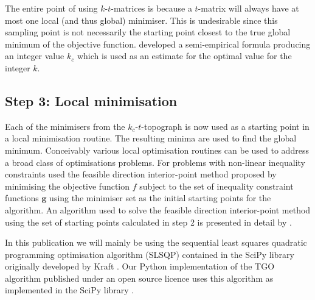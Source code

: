 %
The entire point of using $k$-$t$-matrices is because a $t$-matrix will always have at most one local (and thus global) minimiser. This is undesirable since this sampling point is not necessarily the starting point closest to the true global minimum of the objective function. \citet{Henderson2015} developed a semi-empirical formula producing an integer value $k_c$ which is used as an estimate for the optimal value for the integer $k$.
 
 
\subsection{Step 3: Local minimisation} \label{sec:tgo3}
Each of the minimisers from the  $k_c$-$t$-topograph is now used as a starting point in a local minimisation routine. The resulting minima are used to find the global minimum. Conceivably various local optimisation routines can be used to address a broad class of optimisations problems. For problems with non-linear inequality constraints \citet{Henderson2015} used the feasible direction interior-point method proposed by \citet{Herskovits1998} minimising the objective function $f$ subject to the set of inequality constraint functions $\mathbf{g}$ using the minimiser set as the initial starting points for the algorithm. An algorithm used to solve the feasible direction interior-point method using the set of starting points calculated in step 2 is presented in detail by \citet{Henderson2015}. 

In this publication we will mainly be using the sequential least squares quadratic programming optimisation algorithm (SLSQP) contained in the SciPy library originally developed by Kraft \cite{Kraft1988, Kraft1994}. Our Python implementation of the TGO algorithm published under an open source licence uses this algorithm as implemented in the SciPy library \cite{TGOpy, scipy}.

